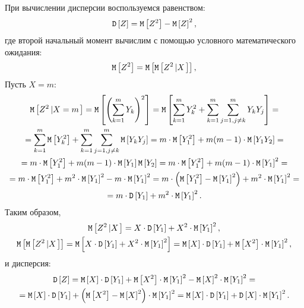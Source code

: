 При вычислении дисперсии воспользуемся равенством:
\begin{equation}
    \mathtt{D} \left [ Z \right ]
    = \mathtt{M} \left [ Z^2 \right ] - \mathtt{M} \left [ Z \right ]^2 ,
\end{equation}
где второй начальный момент вычислим с помощью условного математического ожидания:
\begin{equation}
    \mathtt{M} \left [ Z^2 \right ]
    = \mathtt{M} \left [ \mathtt{M} \left [ Z^2 \left | X \right . \right ] \right ] ,
\end{equation}
Пусть $X = m$:
\begin{multline}
    \mathtt{M} \left [ Z^2 \left | X=m \right . \right ]
    = \mathtt{M} \left [ \left ( \sum_{k=1}^m Y_k \right )^2 \right ]
    = \mathtt{M} \left [ \sum_{k=1}^m Y_k^2 + \sum_{k=1}^m \sum_{j=1, j \neq k}^m Y_k Y_j \right ] = \\
    = \sum_{k=1}^m \mathtt{M} \left [ Y_k^2 \right ] + \sum_{k=1}^m \sum_{j=1, j \neq k}^m \mathtt{M} \left [ Y_k Y_j \right ]
    = m \cdot \mathtt{M} \left [ Y_1^2 \right ] + m(m-1) \cdot \mathtt{M} \left [ Y_1 Y_2 \right ] = \\
    = m \cdot \mathtt{M} \left [ Y_1^2 \right ] + m(m-1) \cdot \mathtt{M} \left [ Y_1 \right ] \mathtt{M} \left [ Y_2 \right ]
    = m \cdot \mathtt{M} \left [ Y_1^2 \right ] + m(m-1) \cdot \mathtt{M} \left [ Y_1 \right ]^2 = \\
    = m \cdot \mathtt{M} \left [ Y_1^2 \right ] + m^2 \cdot \mathtt{M} \left [ Y_1 \right ]^2 - m \cdot \mathtt{M} \left [ Y_1 \right ]^2
    = m \cdot \left ( \mathtt{M} \left [ Y_1^2 \right ] - \mathtt{M} \left [ Y_1 \right ]^2 \right ) + m^2 \cdot \mathtt{M} \left [ Y_1 \right ]^2 = \\
    = m \cdot \mathtt{D} \left [ Y_1 \right ] + m^2 \cdot \mathtt{M} \left [ Y_1 \right ]^2 .
\end{multline}
Таким образом,
\begin{gather}
    \mathtt{M} \left [ Z^2 \left | X \right . \right ]
    = X \cdot \mathtt{D} \left [ Y_1 \right ] + X^2 \cdot \mathtt{M} \left [ Y_1 \right ]^2 , \\
    \mathtt{M} \left [ \mathtt{M} \left [ Z^2 \left | X \right . \right ] \right ]
    = \mathtt{M} \left [ X \cdot \mathtt{D} \left [ Y_1 \right ] + X^2 \cdot \mathtt{M} \left [ Y_1 \right ]^2 \right ]
    = \mathtt{M} \left [ X \right ] \cdot \mathtt{D} \left [ Y_1 \right ] + \mathtt{M} \left [ X^2 \right ] \cdot \mathtt{M} \left [ Y_1 \right ]^2,
\end{gather}
и дисперсия:
\begin{multline}
    \mathtt{D} \left [ Z \right ]
    = \mathtt{M} \left [ X \right ] \cdot \mathtt{D} \left [ Y_1 \right ] + \mathtt{M} \left [ X^2 \right ] \cdot \mathtt{M} \left [ Y_1 \right ]^2 - \mathtt{M} \left [ X \right ]^2 \cdot \mathtt{M} \left [ Y_1 \right ]^2 = \\
    = \mathtt{M} \left [ X \right ] \cdot \mathtt{D} \left [ Y_1 \right ] + \left ( \mathtt{M} \left [ X^2 \right ] - \mathtt{M} \left [ X \right ]^2 \right ) \cdot \mathtt{M} \left [ Y_1 \right ]^2
    = \mathtt{M} \left [ X \right ] \cdot \mathtt{D} \left [ Y_1 \right ] + \mathtt{D} \left [ X \right ] \cdot \mathtt{M} \left [ Y_1 \right ]^2.
\end{multline}
